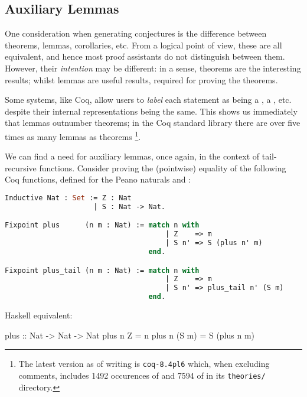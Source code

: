\documentclass[]{article}
\begin{document}
\subsection{Auxiliary Lemmas} \label{auxiliarylemmas}

One consideration when generating conjectures is the difference between theorems, lemmas, corollaries, etc. From a logical point of view, these are all equivalent, and hence most proof assistants do not distinguish between them. However, their \emph{intention} may be different: in a sense, theorems are the interesting results; whilst lemmas are useful results, required for proving the theorems.

Some systems, like Coq, allow users to \emph{label} each statement as being a , a , etc. despite their internal representations being the same. This shows us immediately that lemmas outnumber theorems; in the Coq standard library there are over five times as many lemmas as theorems \footnote{The latest version as of writing is \texttt{coq-8.4pl6} which, when excluding comments, includes 1492 occurences of  and 7594 of  in its \texttt{theories/} directory.}.



We can find a need for auxiliary lemmas, once again, in the context of tail-recursive functions. Consider proving the (pointwise) equality of the following Coq functions, defined for the Peano naturals  and :

\begin{lstlisting}[language=ML, xleftmargin=.2\textwidth, xrightmargin=.2\textwidth]
Inductive Nat : Set := Z : Nat
                     | S : Nat -> Nat.

Fixpoint plus      (n m : Nat) := match n with
                                      | Z    => m
                                      | S n' => S (plus n' m)
                                  end.

Fixpoint plus_tail (n m : Nat) := match n with
                                      | Z    => m
                                      | S n' => plus_tail n' (S m)
                                  end.
\end{lstlisting}

\iffalse
Haskell equivalent:

plus :: Nat -> Nat -> Nat
plus      n  Z    = n
plus      n (S m) = S (plus n m)
\end{document}
